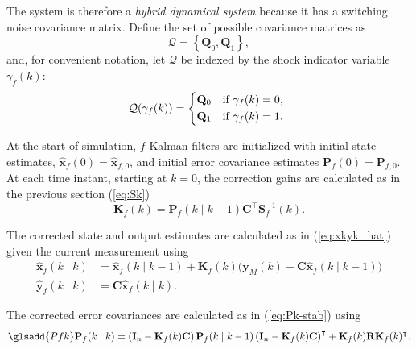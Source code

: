 The system is therefore a \textit{hybrid dynamical system} because it has a switching noise covariance matrix. Define the set of possible covariance matrices as
\begin{equation} \label{eq:init_Q_R}
	\mathcal{Q} = \left\{\mathbf{Q}_0, \mathbf{Q}_1\right\},
\end{equation}
and, for convenient notation, let $\mathcal{Q}$ be indexed by the shock indicator variable $\gamma_f(k)$:
\begin{equation} \label{eq:init_Q}
	\mathcal{Q}(\gamma_f(k)) = 
	\begin{cases*}
		\mathbf{Q}_0 & \text{if} $\gamma_f(k)=0$, \\
		\mathbf{Q}_1 & \text{if} $\gamma_f(k)=1$.
	\end{cases*}
\end{equation}

At the start of simulation, $f$ Kalman filters are initialized with initial state estimates, $\mathbf{\hat{x}}_f(0) = \mathbf{\hat{x}}_{f,0}$, and initial error covariance estimates $	\mathbf{P}_f(0) = \mathbf{P}_{f,0}$. At each time instant, starting at $k=0$, the correction gains are calculated as in the previous section (\ref{eq:Sk})
\begin{equation} \label{eq:Kfk}
	\mathbf{K}_f(k) = \mathbf{P}_f(k \mid k-1)\mathbf{C}^\intercal \mathbf{S}_f^{-1}(k).
\end{equation}

The corrected state and output estimates are calculated as in (\ref{eq:xkyk_hat}) given the current measurement using
\begin{equation} \label{eq:xfkyfk_hat}
	\begin{aligned}
		\mathbf{\hat{x}}_f(k \mid k) &= \mathbf{\hat{x}}_f(k \mid k-1) + \mathbf{K}_f(k) \big( \mathbf{y}_M(k) - \mathbf{C} \mathbf{\hat{x}}_f(k \mid k-1) \big) \\
		\mathbf{\hat{y}}_f(k \mid k) &= \mathbf{C} \mathbf{\hat{x}}_f(k \mid k).
	\end{aligned}
\end{equation}

The corrected error covariances are calculated as in (\ref{eq:Pk-stab}) using 
\begin{equation} \label{eq:Pkf-stab} \glsadd{Pfk}
	\mathbf{P}_f(k \mid k) = \left( \mathbf{I}_n - \mathbf{K}_f(k) \mathbf{C} \right ) \mathbf{P}_f(k \mid k-1) \left( \mathbf{I}_n - \mathbf{K}_f(k) \mathbf{C} \right )^\intercal + \mathbf{K}_f(k)  \mathbf{R} \mathbf{K}_f(k)^\intercal.
\end{equation}

